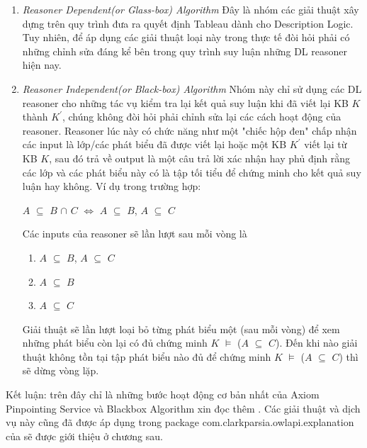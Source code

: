 \begin{enumerate}
	\item \textit{Reasoner Dependent(or Glass-box) Algorithm} Đây là nhóm các giải thuật xây dựng trên quy trình đưa ra quyết định Tableau dành cho Description Logic. Tuy nhiên, để áp dụng các giải thuật loại này trong thực tế đòi hỏi phải có những chỉnh sửa đáng kể bên trong quy trình suy luận những DL reasoner hiện nay.
	\item \textit{Reasoner Independent(or Black-box) Algorithm} Nhóm này chỉ sử dụng các DL reasoner cho những tác vụ kiểm tra lại kết quả suy luận khi đã viết lại KB $K$ thành $K^{'}$, chúng không đòi hỏi phải chỉnh sửa lại các cách hoạt động của reasoner. Reasoner lúc này có chức năng như một "chiếc hộp đen" chấp nhận các input là lớp/các phát biểu đã được viết lại hoặc một KB $K^{'}$ viết lại từ KB $K$, sau đó trả về output là một câu trả lời xác nhận hay phủ định rằng các lớp và các phát biểu này có là tập tối tiểu để chứng minh cho kết quả suy luận hay không. Ví dụ trong trường hợp:
	\begin{center}
		$A$ $\subseteq$ $B$ $\cap$ $C$ $\Leftrightarrow$ $A$ $\subseteq$ $B$, $A$ $\subseteq$ $C$
	\end{center}
	Các inputs của reasoner sẽ lần lượt sau mỗi vòng là 
	\begin{enumerate}
		\item $A$ $\subseteq$ $B$, $A$ $\subseteq$ $C$
		\item $A$ $\subseteq$ $B$
		\item $A$ $\subseteq$ $C$
	\end{enumerate}
	Giải thuật sẽ lần lượt loại bỏ từng phát biểu một (sau mỗi vòng) để xem những phát biểu còn lại có đủ chứng minh  $K$ $\models$ ($A$ $\subseteq$ $C$). Đến khi nào giải thuật không tồn tại tập phát biểu nào đủ để chứng minh $K$ $\models$ ($A$ $\subseteq$ $C$) thì sẽ dừng vòng lặp.
\end{enumerate}
Kết luận: trên đây chỉ là những bước hoạt động cơ bản nhất của Axiom Pinpointing Service và Blackbox Algorithm xin đọc thêm \cite{axiomPinpoint}. Các giải thuật và dịch vụ này cũng đã được áp dụng trong package  com.clarkparsia.owlapi.explanation của \cite{owowlapi} sẽ được giới thiệu ở chương sau.
